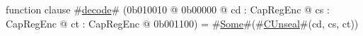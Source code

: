 function clause #\hyperref[sailMIPSzdecode]{decode}# (0b010010 @ 0b00000 @ cd : CapRegEnc @ cs : CapRegEnc @ ct : CapRegEnc @ 0b001100) = #\hyperref[sailMIPSzSome]{Some}#(#\hyperref[sailMIPSzCUnseal]{CUnseal}#(cd, cs, ct))
